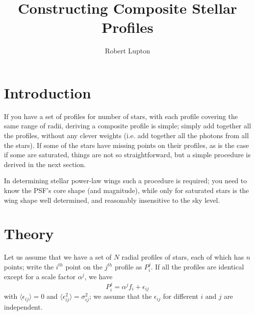 \documentclass[12pt]{article}
\begin{document}
\title{Constructing Composite Stellar Profiles}
\author{Robert Lupton}
\maketitle

\section{Introduction}

If you have a set of profiles for number of stars, with each profile
covering the same range of radii, deriving a composite profile is
simple; simply add together all the profiles,
without any clever weights (i.e. add together all the
photons from all the stars). If some of the stars have missing points
on their profiles, as is the case if some are saturated, things are
not so straightforward, but a simple procedure is derived in the next
section.

In determining stellar power-law wings such a procedure is required; you
need to know the PSF's core shape (and magnitude), while only for
saturated stars is the wing shape well determined, and reasonably insensitive
to the sky level.

\section{Theory}

Let us assume that we have a set of $N$ radial profiles of stars, each
of which has $n$ points; write the $i^{th}$ point on the $j^{th}$ profile
as $P_i^j$. If all the profiles are identical except for a scale
factor $\alpha^j$, we have
$$
P_i^j = \alpha^j f_i + \epsilon_{ij}
$$
with $\langle{\epsilon_{ij}}\rangle = 0$ and
$\langle{\epsilon_{ij}^2}\rangle = \sigma_{ij}^2$; we assume that the
$\epsilon_{ij}$ for different $i$ and $j$ are independent.
\end{document}
